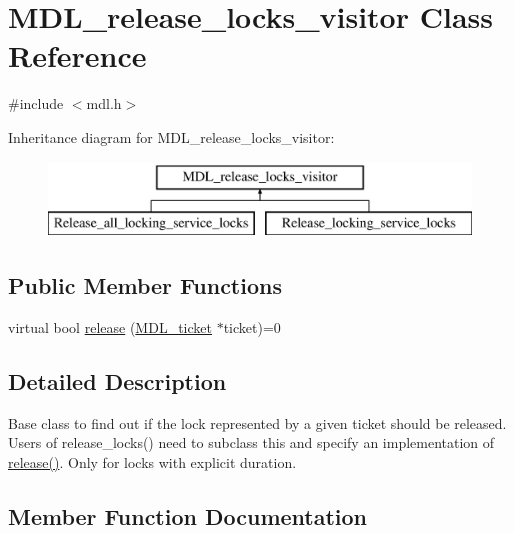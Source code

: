 \hypertarget{classMDL__release__locks__visitor}{}\section{M\+D\+L\+\_\+release\+\_\+locks\+\_\+visitor Class Reference}
\label{classMDL__release__locks__visitor}


{\ttfamily \#include $<$mdl.\+h$>$}

Inheritance diagram for M\+D\+L\+\_\+release\+\_\+locks\+\_\+visitor\+:\begin{figure}[H]
\begin{center}
\leavevmode
\includegraphics[height=2.000000cm]{classMDL__release__locks__visitor}
\end{center}
\end{figure}
\subsection*{Public Member Functions}
\begin{DoxyCompactItemize}
\item 
virtual bool \mbox{\hyperlink{classMDL__release__locks__visitor_a2d71ff221e448ea473b5994d0d52df20}{release}} (\mbox{\hyperlink{classMDL__ticket}{M\+D\+L\+\_\+ticket}} $\ast$ticket)=0
\end{DoxyCompactItemize}


\subsection{Detailed Description}
Base class to find out if the lock represented by a given ticket should be released. Users of release\+\_\+locks() need to subclass this and specify an implementation of \mbox{\hyperlink{classMDL__release__locks__visitor_a2d71ff221e448ea473b5994d0d52df20}{release()}}. Only for locks with explicit duration. 

\subsection{Member Function Documentation}
\mbox{\label{classMDL__release__locks__visitor_a2d71ff221e448ea473b5994d0d52df20}} 
